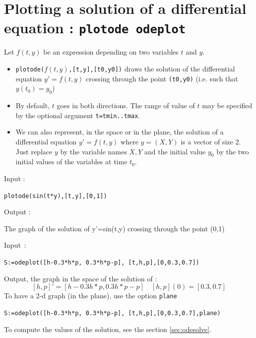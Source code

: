 \documentclass[a4paper,11pt]{book}
\begin{document}
\section{Plotting a solution of a differential equation : {\tt plotode odeplot}}
\noindent Let $f(t,y)$ be an expression depending on two variables 
$t$ and $y$.
\begin{itemize}
\item {\tt plotode($f(t,y)$,[t,y],[t0,y0])} draws the solution of 
the differential equation $y'=f(t,y)$ crossing through 
the point {\tt (t0,y0)} (i.e. such that $y(t_0)=y_0$)
\item
By default, $t$ goes in both directions. The range of value of $t$
may be specified by the optional argument
{\tt t=tmin..tmax}.
\item
We can also represent, in the space or in the plane,
the solution of a differential equation 
$y'=f(t,y)$ where $y=(X,Y)$ is a vector of size 2.
Just replace  $y$ by the variable names $X,Y$
and the initial value $y_0$ by the two initial values of the
variables at time $t_0$.
\end{itemize}
Input :
\begin{center}{\tt plotode(sin(t*y),[t,y],[0,1]) }\end{center}
Output :
\begin{center}{The graph of the solution of y'=sin(t,y) crossing through the point (0,1)}\end{center}
Input~:
\begin{center}
{\tt S:=odeplot([h-0.3*h*p, 0.3*h*p-p], [t,h,p],[0,0.3,0.7])}
\end{center}
Output, the graph in the space of the solution of :
\[ [h,p]'=[h-0.3 h*p, 0.3 h*p-p] \quad [h,p](0)=[0.3,0.7] \]
To have a 2-d graph (in the plane), use the option 
{\tt plane}
\begin{center}
{\tt S:=odeplot([h-0.3*h*p, 0.3*h*p-p], [t,h,p],[0,0.3,0.7],plane)}
\end{center}
To compute the values of the solution, see
the section \ref{sec:odesolve}.
\end{document}
